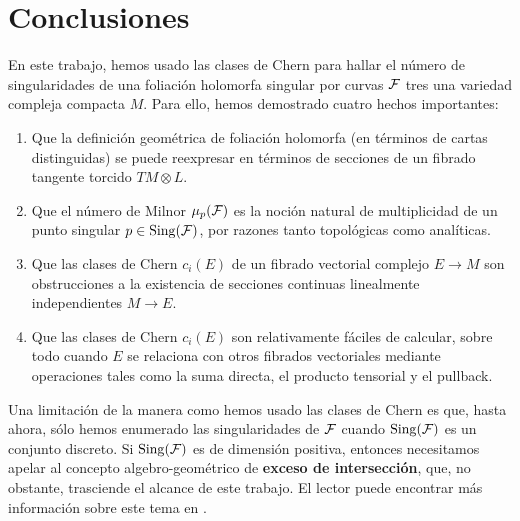 \section{Conclusiones}

En este trabajo, hemos usado las clases de Chern para hallar el número de singularidades de una foliación holomorfa singular por curvas $\mathcal F$ tres una variedad compleja compacta $M$. Para ello, hemos demostrado cuatro hechos importantes:

\begin{enumerate}[label=\alph*)]
    \itemsep 0em
    \item Que la definición geométrica de foliación holomorfa (en términos de cartas distinguidas) se puede reexpresar en términos de secciones de un fibrado tangente torcido $TM \otimes L$.
    
    \item Que el número de Milnor $\mu_p(\mathcal F)$ es la noción natural de multiplicidad de un punto singular $p \in \operatorname{Sing}(\mathcal F)$, por razones tanto topológicas como analíticas.
    
    \item Que las clases de Chern $c_i(E)$ de un fibrado vectorial complejo $E \to M$ son obstrucciones a la existencia de secciones continuas linealmente independientes $M \to E$.
    
    \item Que las clases de Chern $c_i(E)$ son relativamente fáciles de calcular, sobre todo cuando $E$ se relaciona con otros fibrados vectoriales mediante operaciones tales como la suma directa, el producto tensorial y el pullback.
\end{enumerate}

Una limitación de la manera como hemos usado las clases de Chern es que, hasta ahora, sólo hemos enumerado las singularidades de $\mathcal F$ cuando $\operatorname{Sing}(\mathcal F)$ es un conjunto discreto. Si $\operatorname{Sing}(\mathcal F)$ es de dimensión positiva, entonces necesitamos apelar al concepto algebro-geométrico de \textbf{exceso de intersección}, que, no obstante, trasciende el alcance de este trabajo. El lector puede encontrar más información sobre este tema en \cite[cap. 9, pp. 153-174]{fulton}.
